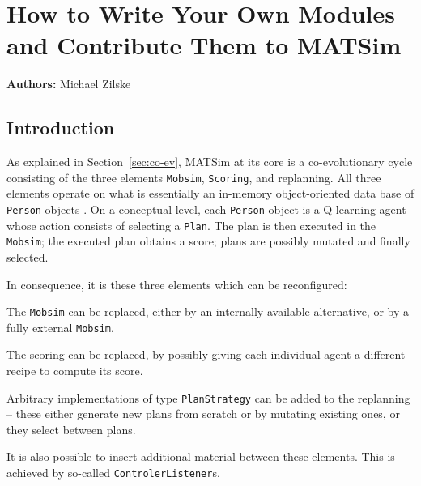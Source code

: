 \chapter{How to Write Your Own Modules and Contribute Them to MATSim}
\label{ch:extensionpoints}
\hfill \textbf{Authors:} Michael Zilske

\section{Introduction}
\label{sec:ownmodules-intro}
As explained in Section~\ref{sec:co-ev}, MATSim at its core is a co-evolutionary cycle consisting of the three elements \lstinline$Mobsim$, \lstinline$Scoring$, and replanning. All three elements operate on what is essentially an in-memory object-oriented data base of \lstinline$Person$ objects \citep{RaneyNagel2006traf-framework}.  
%
On a conceptual level, each \lstinline$Person$ object is a Q-learning agent \citep[][Chapter~21]{RusselNorvig2010ArtificialIntelligence} whose action consists of selecting a \lstinline$Plan$.  The plan is then executed in the \lstinline$Mobsim$; the executed plan obtains a score; plans are possibly mutated and finally selected.

In consequence, it is these three elements which can be reconfigured:
\begin{compactitem}
\item The \lstinline$Mobsim$ can be replaced, either by an internally available alternative, or by a fully external \lstinline$Mobsim$.
\item The scoring can be replaced, by possibly giving each individual agent a different recipe to compute its score.
\item Arbitrary implementations of type \lstinline$PlanStrategy$ can be added to the replanning -- these either generate new plans from scratch or by mutating existing ones, or they select between plans.
\end{compactitem}
It is also possible to insert additional material between these elements. This is achieved by so-called \lstinline$ControlerListener$s.

